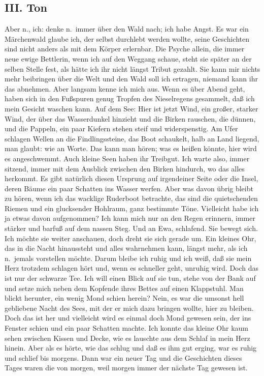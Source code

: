 \documentclass[
]{article}
\author{}
\date{\vspace{-2.5em}}
\begin{document}
\subsection{III. Ton}\label{iii.-ton}

Aber n., ich: denke n.~immer über den Wald nach; ich habe Angst. Es war
ein Märchenwald glaube ich, der selbst durchlebt werden wollte, seine
Geschichten sind nicht anders als mit dem Körper erlernbar. Die Psyche
allein, die immer neue ewige Bettlerin, wenn ich auf den Weggang schaue,
steht sie später an der selben Stelle fest, als hätte ich ihr nicht
längst Tribut gezahlt. Sie kann mir nichts mehr beibringen über die Welt
und den Wald soll ich ertragen, niemand kann ihr das abnehmen. Aber
langsam kenne ich mich aus. Wenn es über Abend geht, haben sich in den
Fußspuren genug Tropfen des Nieselregens gesammelt, daß ich mein Gesicht
waschen kann. Auf dem See: Hier ist jetzt Wind, ein großer, starker
Wind, der über das Wasserdunkel hinzieht und die Birken rauschen, die
dünnen, und die Pappeln, ein paar Kiefern stehen steif und
widerspenstig. Am Ufer schlagen Wellen an die Findlingssteine, das Boot
schaukelt, halb an Land liegend, man glaubt: wie an Worte. Das kann man
hören; was es heißen könnte, hier wird es angeschwemmt. Auch kleine Seen
haben ihr Treibgut. Ich warte also, immer sitzend, immer mit dem
Ausblick zwischen den Birken hindurch, wo das alles herkommt. Es gibt
natürlich diesen Ursprung auf irgendeiner Seite oder die Insel, deren
Bäume ein paar Schatten ins Wasser werfen. Aber was davon übrig bleibt
zu hören, wenn ich das wacklige Ruderboot betrachte, das sind die
quietschenden Riemen und ein glucksender Hohlraum, ganz bestimmte Töne.
Vielleicht habe ich ja etwas davon aufgenommen? Ich kann mich nur an den
Regen erinnern, immer stärker und barfuß auf dem nassen Steg. Und an
Ewa, schlafend. Sie bewegt sich. Ich möchte sie weiter anschauen, doch
dreht sie sich gerade um. Ein kleines Ohr, das in die Nacht hinaussteht
und alles wahrnehmen kann, längst mehr, als ich n.~jemals vorstellen
möchte. Darum bleibe ich ruhig und ich weiß, daß sie mein Herz trotzdem
schlagen hört und, wenn es schneller geht, unruhig wird. Doch das ist
nur der schwarze Tee. Ich will einen Blick auf sie tun, stehe von der
Bank auf und setze mich neben dem Kopfende ihres Bettes auf einen
Klappstuhl. Man blickt herunter, ein wenig Mond schien herein? Nein, es
war die umsonst hell gebliebene Nacht des Sees, mit der er mich dazu
bringen wollte, hier zu bleiben. Doch das ist her und vielleicht wird es
einmal doch Mond gewesen sein, der ins Fenster schien und ein paar
Schatten machte. Ich konnte das kleine Ohr kaum sehen zwischen Kissen
und Decke, wie es lauschte aus dem Schlaf in mein Herz hinein. Aber als
es hörte, wie das schlug und daß es ihm gut erging, war es ruhig und
schlief bis morgens. Dann war ein neuer Tag und die Geschichten dieses
Tages waren die von morgen, weil morgen immer der nächste Tag gewesen
ist.
\end{document}
